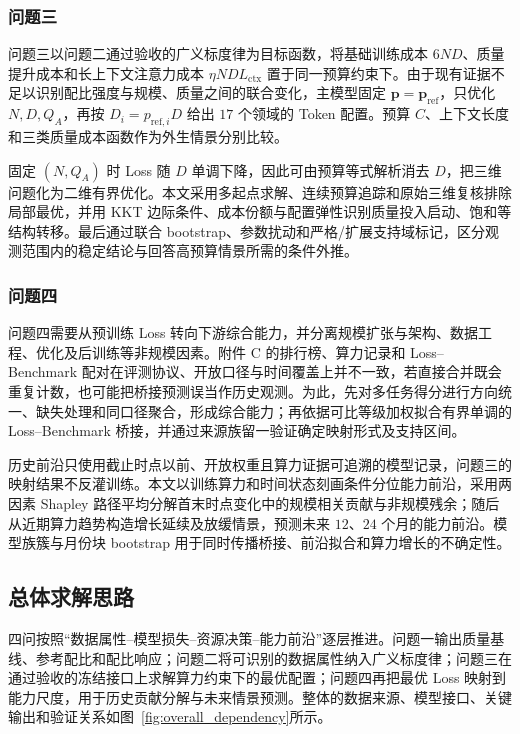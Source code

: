 \subsubsection{问题三}

问题三以问题二通过验收的广义标度律为目标函数，将基础训练成本 $6ND$、质量提升成本和长上下文注意力成本 $\eta NDL_{\mathrm{ctx}}$ 置于同一预算约束下。由于现有证据不足以识别配比强度与规模、质量之间的联合变化，主模型固定 $\boldsymbol p=\boldsymbol p_{\mathrm{ref}}$，只优化 $N,D,Q_A$，再按 $D_i=p_{\mathrm{ref},i}D$ 给出 $17$ 个领域的 Token 配置。预算 $C$、上下文长度和三类质量成本函数作为外生情景分别比较。

固定 $(N,Q_A)$ 时 Loss 随 $D$ 单调下降，因此可由预算等式解析消去 $D$，把三维问题化为二维有界优化。本文采用多起点求解、连续预算追踪和原始三维复核排除局部最优，并用 KKT 边际条件、成本份额与配置弹性识别质量投入启动、饱和等结构转移。最后通过联合 bootstrap、参数扰动和严格/扩展支持域标记，区分观测范围内的稳定结论与回答高预算情景所需的条件外推。

\subsubsection{问题四}

问题四需要从预训练 Loss 转向下游综合能力，并分离规模扩张与架构、数据工程、优化及后训练等非规模因素。附件 C 的排行榜、算力记录和 Loss--Benchmark 配对在评测协议、开放口径与时间覆盖上并不一致，若直接合并既会重复计数，也可能把桥接预测误当作历史观测。为此，先对多任务得分进行方向统一、缺失处理和同口径聚合，形成综合能力；再依据可比等级加权拟合有界单调的 Loss--Benchmark 桥接，并通过来源族留一验证确定映射形式及支持区间。

历史前沿只使用截止时点以前、开放权重且算力证据可追溯的模型记录，问题三的映射结果不反灌训练。本文以训练算力和时间状态刻画条件分位能力前沿，采用两因素 Shapley 路径平均分解首末时点变化中的规模相关贡献与非规模残余；随后从近期算力趋势构造增长延续及放缓情景，预测未来 $12$、$24$ 个月的能力前沿。模型族簇与月份块 bootstrap 用于同时传播桥接、前沿拟合和算力增长的不确定性。

\subsection{总体求解思路}

四问按照“数据属性--模型损失--资源决策--能力前沿”逐层推进。问题一输出质量基线、参考配比和配比响应；问题二将可识别的数据属性纳入广义标度律；问题三在通过验收的冻结接口上求解算力约束下的最优配置；问题四再把最优 Loss 映射到能力尺度，用于历史贡献分解与未来情景预测。整体的数据来源、模型接口、关键输出和验证关系如图~\ref{fig:overall_dependency}所示。


